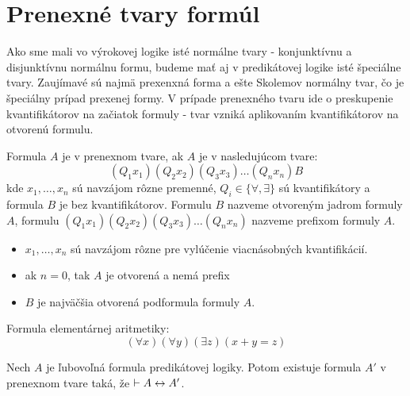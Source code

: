 
\section{Prenexné tvary formúl}

Ako sme mali vo výrokovej logike isté normálne tvary - konjunktívnu a
disjunktívnu normálnu formu, budeme mať aj v predikátovej logike isté
špeciálne tvary. Zaujímavé sú najmä prexenxná forma a ešte Skolemov
normálny tvar, čo je špeciálny prípad prexenej formy.
V prípade prenexného tvaru ide o preskupenie kvantifikátorov na
začiatok formuly - tvar vzniká aplikovaním kvantifikátorov na otvorenú
formulu.


\begin{definicia}
    Formula $A$ je v prenexnom tvare, ak $A$ je v nasledujúcom tvare:
    \begin{equation*}
     (Q_1 x_1) (Q_2 x_2) (Q_3 x_3) \dots (Q_n x_n) B
    \end{equation*}
    kde $x_1, \dots , x_n$ sú navzájom rôzne premenné,
    $Q_i \in\{\forall, \exists\}$ sú
    kvantifikátory a  formula $B$ je bez kvantifikátorov.
    Formulu $B$ nazveme otvoreným jadrom formuly $A$, 
    formulu $(Q_1 x_1) (Q_2 x_2) (Q_3 x_3) \dots (Q_n x_n)$ nazveme
    prefixom formuly $A$.
\end{definicia}

\begin{poznamka}
    \noindent
    \begin{itemize}
     \item $x_1, \dots, x_n$ sú navzájom rôzne pre vylúčenie viacnásobných
        kvantifikácií.
     \item ak $n=0$, tak $A$ je otvorená a nemá prefix
     \item $B$ je najväčšia otvorená podformula formuly $A$.
    \end{itemize}
\end{poznamka}

\begin{priklad}
    Formula elementárnej aritmetiky:
    \begin{equation*}
        (\forall x) (\forall y) (\exists z) (x+y=z)
    \end{equation*}
\end{priklad}

\begin{veta}
 Nech $A$ je ľubovoľná formula predikátovej logiky. Potom existuje
 formula $A'$ v prenexnom tvare taká, že
 $\vdash A \leftrightarrow A'$.
 \label{veta:prenex}
\end{veta}

